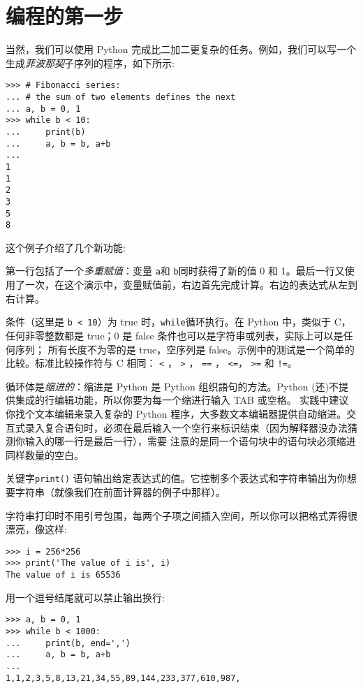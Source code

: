 \section{编程的第一步}
当然，我们可以使用 Python 完成比二加二更复杂的任务。例如，我们可以写一个生成\emph{菲波那契}子序列的程序，如下所示:
\begin{lstlisting}
>>> # Fibonacci series:
... # the sum of two elements defines the next
... a, b = 0, 1
>>> while b < 10:
...     print(b)
...     a, b = b, a+b
...
1
1
2
3
5
8
\end{lstlisting}
这个例子介绍了几个新功能:
\begin{compactitem}
  \item 第一行包括了一个\emph{多重赋值}：变量 \verb|a|和 \verb|b|同时获得了新的值 0 和 1。最后一行又使用了一次，在这个演示中，变量赋值前，右边首先完成计算。右边的表达式从左到右计算。
  \item 条件（这里是 \cprotect\texttt{b \verb|<| 10}）为 true 时，\texttt{while}循环执行。在 Python 中，类似于 C，任何非零整数都是 true；0 是 false 条件也可以是字符串或列表，实际上可以是任何序列；
      所有长度不为零的是 true，空序列是 false。示例中的测试是一个简单的比较。标准比较操作符与 C 相同： \verb|<| ， \verb|>| ， \verb|==| ， \verb|<=|， \verb|>=| 和 \verb|!=|。
  \item 循环体是\emph{缩进的}：缩进是 Python 是 Python 组织語句的方法。Python (还)不提供集成的行编辑功能，所以你要为每一个缩进行输入 TAB 或空格。 实践中建议你找个文本编辑来录入复杂的 Python 程序，大多数文本编辑器提供自动缩进。交互式录入复合语句时，必须在最后输入一个空行来标识结束（因为解释器没办法猜测你输入的哪一行是最后一行），需要 注意的是同一个语句块中的语句块必须缩进同样数量的空白。
  \item 关键字\texttt{print()} 语句输出给定表达式的值。它控制多个表达式和字符串输出为你想要字符串（就像我们在前面计算器的例子中那样）。

      字符串打印时不用引号包围，每两个子项之间插入空间，所以你可以把格式弄得很漂亮，像这样:
\begin{lstlisting}
>>> i = 256*256
>>> print('The value of i is', i)
The value of i is 65536
\end{lstlisting}
        用一个逗号结尾就可以禁止输出换行:
\begin{lstlisting}
>>> a, b = 0, 1
>>> while b < 1000:
...     print(b, end=',')
...     a, b = b, a+b
...
1,1,2,3,5,8,13,21,34,55,89,144,233,377,610,987,
\end{lstlisting}
\end{compactitem}
